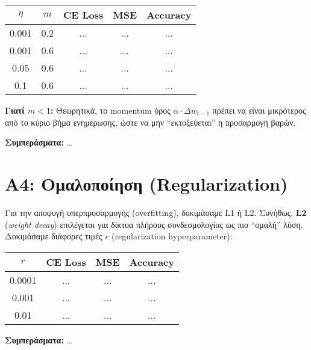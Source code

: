 \documentclass[a4paper,11pt]{article}
\begin{document}
\begin{center}
\begin{tabular}{|c|c|c|c|c|}
\hline
\textbf{$\eta$} & \textbf{$m$} & \textbf{CE Loss} & \textbf{MSE} & \textbf{Accuracy} \\
\hline
0.001 & 0.2 & ... & ... & ... \\
\hline
0.001 & 0.6 & ... & ... & ... \\
\hline
0.05  & 0.6 & ... & ... & ... \\
\hline
0.1   & 0.6 & ... & ... & ... \\
\hline
\end{tabular}
\end{center}

\noindent
\textbf{Γιατί $m < 1$:} Θεωρητικά, το momentum όρος $\alpha \cdot \Delta w_{t-1}$ πρέπει να
είναι μικρότερος από το κύριο βήμα ενημέρωσης, ώστε να μην “εκτοξεύεται” η προσαρμογή
βαρών. %

\noindent
\textbf{Συμπεράσματα:} \dots

\section{A4: Ομαλοποίηση (Regularization)}
Για την αποφυγή υπερπροσαρμογής (overfitting), δοκιμάσαμε L1 ή L2. Συνήθως, \textbf{L2}
(\emph{weight decay}) επιλέγεται για δίκτυα πλήρους συνδεσμολογίας ως πιο “ομαλή”
λύση. Δοκιμάσαμε διάφορες τιμές $r$ (regularization hyperparameter):

\begin{center}
\begin{tabular}{|c|c|c|c|}
\hline
\textbf{$r$} & \textbf{CE Loss} & \textbf{MSE} & \textbf{Accuracy} \\
\hline
0.0001 & ... & ... & ... \\
\hline
0.001  & ... & ... & ... \\
\hline
0.01   & ... & ... & ... \\
\hline
\end{tabular}
\end{center}

\noindent
\textbf{Συμπεράσματα:} \dots

\end{document}
